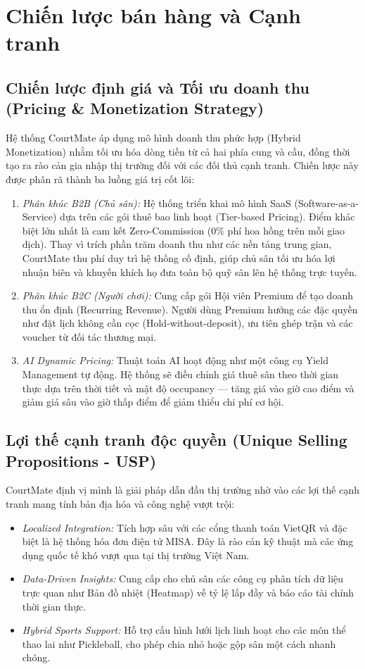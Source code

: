 \section{Chiến lược bán hàng và Cạnh tranh}

\subsection{Chiến lược định giá và Tối ưu doanh thu (Pricing \& Monetization Strategy)}
Hệ thống CourtMate áp dụng mô hình doanh thu phức hợp (Hybrid Monetization) nhằm tối ưu hóa dòng tiền từ cả hai phía cung và cầu, đồng thời tạo ra rào cản gia nhập thị trường đối với các đối thủ cạnh tranh. Chiến lược này được phân rã thành ba luồng giá trị cốt lõi:

\begin{enumerate}
    \item \textit{Phân khúc B2B (Chủ sân):} Hệ thống triển khai mô hình SaaS (Software-as-a-Service) dựa trên các gói thuê bao linh hoạt (Tier-based Pricing). Điểm khác biệt lớn nhất là cam kết Zero-Commission (0\% phí hoa hồng trên mỗi giao dịch). Thay vì trích phần trăm doanh thu như các nền tảng trung gian, CourtMate thu phí duy trì hệ thống cố định, giúp chủ sân tối ưu hóa lợi nhuận biên và khuyến khích họ đưa toàn bộ quỹ sân lên hệ thống trực tuyến.
    \item \textit{Phân khúc B2C (Người chơi):} Cung cấp gói Hội viên Premium để tạo doanh thu ổn định (Recurring Revenue). Người dùng Premium hưởng các đặc quyền như đặt lịch không cần cọc (Hold-without-deposit), ưu tiên ghép trận và các voucher từ đối tác thương mại.
    \item \textit{AI Dynamic Pricing:} Thuật toán AI hoạt động như một công cụ Yield Management tự động. Hệ thống sẽ điều chỉnh giá thuê sân theo thời gian thực dựa trên thời tiết và mật độ occupancy — tăng giá vào giờ cao điểm và giảm giá sâu vào giờ thấp điểm để giảm thiểu chi phí cơ hội.
\end{enumerate}

\subsection{Lợi thế cạnh tranh độc quyền (Unique Selling Propositions - USP)}
CourtMate định vị mình là giải pháp dẫn đầu thị trường nhờ vào các lợi thế cạnh tranh mang tính bản địa hóa và công nghệ vượt trội:
\begin{itemize}
    \item \textit{Localized Integration:} Tích hợp sâu với các cổng thanh toán VietQR và đặc biệt là hệ thống hóa đơn điện tử MISA. Đây là rào cản kỹ thuật mà các ứng dụng quốc tế khó vượt qua tại thị trường Việt Nam.
    \item \textit{Data-Driven Insights:} Cung cấp cho chủ sân các công cụ phân tích dữ liệu trực quan như Bản đồ nhiệt (Heatmap) về tỷ lệ lấp đầy và báo cáo tài chính thời gian thực.
    \item \textit{Hybrid Sports Support:} Hỗ trợ cấu hình lưới lịch linh hoạt cho các môn thể thao lai như Pickleball, cho phép chia nhỏ hoặc gộp sân một cách nhanh chóng.
\end{itemize}

